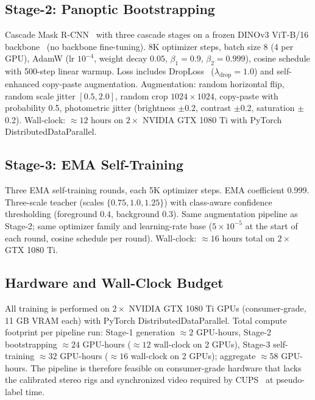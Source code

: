 \documentclass{article}
\begin{document}
\subsection{Stage-2: Panoptic Bootstrapping}
\label{sec:supp:impl:stage2}

Cascade Mask R-CNN~\cite{cai2018cascade} with three cascade stages on a frozen DINOv3 ViT-B/16 backbone~\cite{simeoni2025dinov3} (no backbone fine-tuning). 8K optimizer steps, batch size 8 (4 per GPU), AdamW (lr $10^{-4}$, weight decay $0.05$, $\beta_1{=}0.9$, $\beta_2{=}0.999$), cosine schedule with 500-step linear warmup. Loss includes DropLoss~\cite{wang2023cutler} ($\lambda_\text{drop}{=}1.0$) and self-enhanced copy-paste augmentation. Augmentation: random horizontal flip, random scale jitter $[0.5, 2.0]$, random crop $1024\times1024$, copy-paste with probability 0.5, photometric jitter (brightness $\pm$0.2, contrast $\pm$0.2, saturation $\pm$0.2). Wall-clock: $\approx 12$ hours on $2\times$ NVIDIA GTX 1080 Ti with PyTorch DistributedDataParallel.

\subsection{Stage-3: EMA Self-Training}
\label{sec:supp:impl:stage3}

Three EMA self-training rounds, each 5K optimizer steps. EMA coefficient 0.999. Three-scale teacher (scales $\{0.75, 1.0, 1.25\}$) with class-aware confidence thresholding (foreground $0.4$, background $0.3$). Same augmentation pipeline as Stage-2; same optimizer family and learning-rate base ($5\times10^{-5}$ at the start of each round, cosine schedule per round). Wall-clock: $\approx 16$ hours total on $2\times$ GTX 1080 Ti.

\subsection{Hardware and Wall-Clock Budget}
\label{sec:supp:impl:hardware}

All training is performed on $2\times$ NVIDIA GTX 1080 Ti GPUs (consumer-grade, 11 GB VRAM each) with PyTorch DistributedDataParallel. Total compute footprint per pipeline run: Stage-1 generation $\approx 2$ GPU-hours, Stage-2 bootstrapping $\approx 24$ GPU-hours ($\approx 12$ wall-clock on 2 GPUs), Stage-3 self-training $\approx 32$ GPU-hours ($\approx 16$ wall-clock on 2 GPUs); aggregate $\approx 58$ GPU-hours. The pipeline is therefore feasible on consumer-grade hardware that lacks the calibrated stereo rigs and synchronized video required by CUPS~\cite{hahn2025cups} at pseudo-label time.
\end{document}
